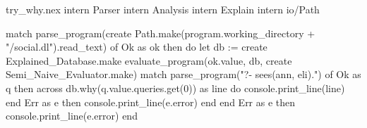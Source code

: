 \begin{tryit}{try_why.nex}
intern Parser
intern Analysis
intern Explain
intern io/Path

match parse_program(create Path.make(program.working_directory + "/social.dl").read_text) of
  Ok as ok then
    do
      let db := create Explained_Database.make
      evaluate_program(ok.value, db, create Semi_Naive_Evaluator.make)
      match parse_program("?- sees(ann, eli).") of
        Ok as q then
          across db.why(q.value.queries.get(0)) as line do
            console.print_line(line)
          end
        Err as e then console.print_line(e.error)
      end
    end
  Err as e then console.print_line(e.error)
end
\end{tryit}
